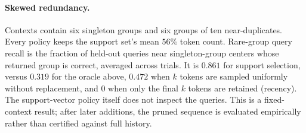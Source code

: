 \paragraph{Skewed redundancy.}
Contexts contain six singleton groups and six groups of ten near-duplicates.
Every policy keeps the support set's mean \(56\%\) token count. Rare-group query
recall is the fraction of held-out queries near singleton-group centers whose
returned group is correct, averaged across trials. It is \(0.861\) for support
selection, versus \(0.319\) for the oracle above, \(0.472\) when \(k\) tokens
are sampled uniformly without replacement, and \(0\) when only the final \(k\)
tokens are retained (recency). The support-vector policy itself does not inspect
the queries. This is a fixed-context result; after later additions, the pruned
sequence is evaluated empirically rather than certified against full history.

